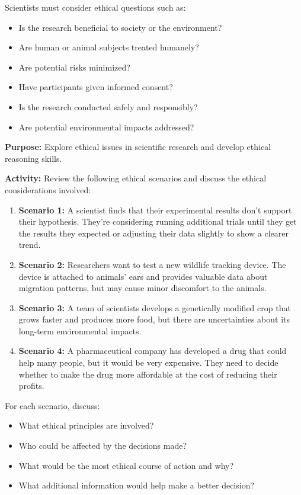 \documentclass[justified,notoc]{tufte-book}
\newenvironment{investigation}[1]{%
    \begin{tcolorbox}[colback=info!10,colframe=info,title=\textbf{Investigation: #1}]
}{%
    \end{tcolorbox}
}
\begin{document}
Scientists must consider ethical questions such as:
\begin{itemize}
    \item Is the research beneficial to society or the environment?
    \item Are human or animal subjects treated humanely?
    \item Are potential risks minimized?
    \item Have participants given informed consent?
    \item Is the research conducted safely and responsibly?
    \item Are potential environmental impacts addressed?
\end{itemize}

\begin{investigation}{Ethical Case Studies in Science}
\textbf{Purpose:} Explore ethical issues in scientific research and develop ethical reasoning skills.

\textbf{Activity:} Review the following ethical scenarios and discuss the ethical considerations involved:

\begin{enumerate}
    \item \textbf{Scenario 1:} A scientist finds that their experimental results don't support their hypothesis. They're considering running additional trials until they get the results they expected or adjusting their data slightly to show a clearer trend.
    
    \item \textbf{Scenario 2:} Researchers want to test a new wildlife tracking device. The device is attached to animals' ears and provides valuable data about migration patterns, but may cause minor discomfort to the animals.
    
    \item \textbf{Scenario 3:} A team of scientists develops a genetically modified crop that grows faster and produces more food, but there are uncertainties about its long-term environmental impacts.
    
    \item \textbf{Scenario 4:} A pharmaceutical company has developed a drug that could help many people, but it would be very expensive. They need to decide whether to make the drug more affordable at the cost of reducing their profits.
\end{enumerate}

For each scenario, discuss:
\begin{itemize}
    \item What ethical principles are involved?
    \item Who could be affected by the decisions made?
    \item What would be the most ethical course of action and why?
    \item What additional information would help make a better decision?
\end{itemize}
\end{investigation}
\end{document}
